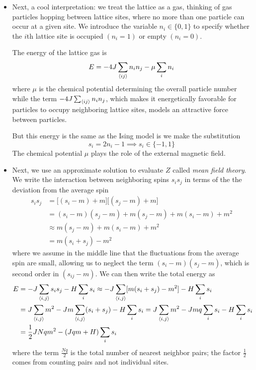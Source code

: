 \documentclass[11pt, a4paper]{article}
\begin{document}
\begin{itemize}
	\item Next, a cool interpretation: we treat the lattice as a gas, thinking of gas particles hopping between lattice sites, where no more than one particle can occur at a given site. We introduce the variable $ n_{i} \in \{0, 1\} $ to specify whether the $ i $th lattice site is occupied $ (n_{i} = 1) $ or empty $ (n_{i} = 0) $.
	
	The energy of the lattice gas is 
	\begin{equation*}
		E = - 4J \sum_{\expval{i j}}n_{i}n_{j} - \mu \sum_{i}n_{i}
	\end{equation*}
	where $ \mu $ is the chemical potential determining the overall particle number while the term $ - 4J \sum_{\expval{i j}}n_{i}n_{j} $, which makes it energetically favorable for particles to occupy neighboring lattice sites, models an attractive force between particles. 
	
	But this energy is the same as the Ising model is we make the substitution
	\begin{equation*}
		s_{i} = 2n_{i} - 1 \implies s_{i} \in \{-1, 1\}
	\end{equation*}
	The chemical potential $ \mu $ plays the role of the external magnetic field.
	
	\item Next, we use an approximate solution to evaluate $ Z $ called \textit{mean field theory}. We write the interaction between neighboring spins $ s_{i}s_{j} $ in terms of the the deviation from the average spin
	\begin{align*}
		s_{i}s_{j} &= \big[(s_{i} - m) + m\big]\big[(s_{j} - m) + m\big]\\
		&=(s_{i}-m)(s_{j}-m) + m(s_{j}-m) + m(s_{i}-m) + m^{2}\\
		&\approx m(s_{j}-m) + m(s_{i}-m) + m^{2}\\
		&= m(s_{i}+s_{j}) - m^{2}
	\end{align*}
	where we assume in the middle line that the fluctuations from the average spin are small, allowing us to neglect the term $ (s_{i}-m)(s_{j}-m) $, which is second order in $ (s_{ij}-m) $. We can then write the total energy as
	\begin{align*}
		E &= - J\sum_{\expval{i, j}}s_{i}s_{j} - H \sum_{i}s_{i} \approx  -J \sum_{\expval{i, j}}[m(s_{i}+s_{j}) - m^{2}] - H \sum_{i}s_{i}\\
		&=J\sum_{\expval{i, j}} m^{2} - J m \sum_{\expval{i, j}}(s_{i}+s_{j}) - H \sum_{i}s_{i} = J\sum_{\expval{i, j}} m^{2} - J mq \sum_{i}s_{i} - H \sum_{i}s_{i}\\
		&=\frac{1}{2}JNqm^{2} - (Jqm + H)\sum_{i}s_{i}
	\end{align*}
	where the term $ \frac{Nq}{2} $ is the total number of nearest neighbor pairs; the factor $ \frac{1}{2} $ comes from counting pairs and not individual sites. 
	

\end{itemize}
\end{document}
